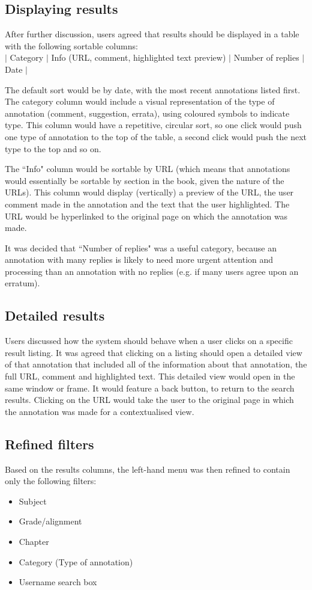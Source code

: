 \subsection{Displaying results}
After further discussion, users agreed that results should be displayed in a table with the following sortable columns:\\ 
$\vert$ Category $\vert$ Info (URL, comment, highlighted text preview) $\vert$ Number of replies $\vert$ Date $\vert$

The default sort would be by date, with the most recent annotations listed first. The category column would include a visual representation of the type of annotation (comment, suggestion, errata), using coloured symbols to indicate type. This column would have a repetitive, circular sort, so one click would push one type of annotation to the top of the table, a second click would push the next type to the top and so on. 

The ``Info" column would be sortable by URL (which means that annotations would essentially be sortable by section in the book, given the nature of the URLs). This column would display (vertically) a preview of the URL, the user comment made in the annotation and the text that the user highlighted. The URL would be hyperlinked to the original page on which the annotation was made. 

It was decided that ``Number of replies" was a useful category, because an annotation with many replies is likely to need more urgent attention and processing than an annotation with no replies (e.g. if many users agree upon an erratum).

\subsection{Detailed results}
Users discussed how the system should behave when a user clicks on a specific result listing. It was agreed that clicking on a listing should open a detailed view of that annotation that included all of the information about that annotation, the full URL, comment and highlighted text. This detailed view would open in the same window or frame. It would feature a back button, to return to the search results. Clicking on the URL would take the user to the original page in which the annotation was made for a contextualised view. 

\subsection{Refined filters}
Based on the results columns, the left-hand menu was then refined to contain only the following filters:
\begin{itemize}
\item Subject
\item Grade/alignment
\item Chapter
\item Category (Type of annotation)
\item Username search box 
\end{itemize}

